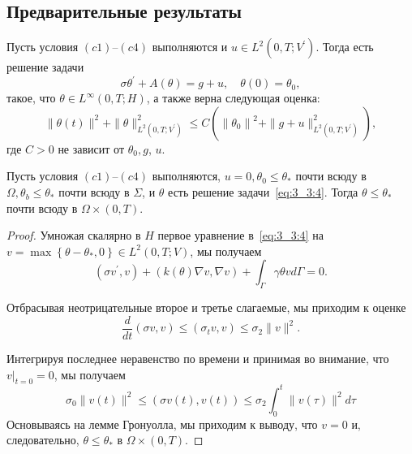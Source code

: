 \subsection{Предварительные результаты}
\label{subsec:ch3:sec3:subsec3}

\begin{lemma}
    \label{lm:3_3:1}
    Пусть условия $(c1)$--$(c4)$ выполняются и
    $u \in L^{2}\left(0, T ; V^{\prime}\right)$.
    Тогда есть решение задачи
    \begin{equation}
        \label{eq:3_3:4}
        \sigma \theta^{\prime}+A(\theta)=g+u, \quad \theta(0)=\theta_{0},
    \end{equation}
    такое, что $\theta \in L^{\infty}(0, T ; H)$, а также верна следующая оценка:
    \[
        \|\theta(t)\|^{2}+\|\theta\|_{L^{2}\left(0, T ; V^{\prime}\right)}^{2}
        \leq C\left(\left\|\theta_{0}\right\|^{2}+\|g+u\|_{L^{2}
        \left(0, T; V^{\prime}\right)}^{2}\right),
    \]
    где $C>0$ не зависит от $\theta_{0}, g$, $u$.
\end{lemma}

\begin{lemma}
    \label{lm:3_3:2}
    Пусть условия $(c1)$--$(c4)$ выполняются, $u=0, \theta_{0} \leq \theta_{*}$ почти всюду
    в $\Omega, \theta_{b} \leq \theta_{*}$ почти всюду в $\Sigma$, и $\theta$ есть
    решение задачи~\eqref{eq:3_3:4}.
    Тогда $\theta \leq \theta_{*}$ почти всюду в $\Omega \times(0, T)$.
\end{lemma}

\begin{proof}
    Умножая скалярно в $H$ первое уравнение в~\eqref{eq:3_3:4} на
    $v=\max \left\{\theta-\theta_{*}, 0\right\}\in L^{2}(0, T; V)$, мы получаем
    \[
        \left(\sigma v^{\prime}, v\right)+(k(\theta) \nabla v, \nabla v)
        + \int_{\Gamma} \gamma \theta v d \Gamma=0.
    \]

    Отбрасывая неотрицательные второе и третье слагаемые, мы приходим к оценке
    \[
        \frac{d}{d t}(\sigma v, v) \leq\left(\sigma_{t} v, v\right) \leq \sigma_{2}\|v\|^{2}.
    \]

    Интегрируя последнее неравенство по времени и принимая во внимание,
    что $\left.v\right|_{t=0}=0$, мы получаем
    \[
        \sigma_{0}\|v(t)\|^{2} \leq(\sigma v(t), v(t))
        \leq \sigma_{2} \int_{0}^{t}\|v(\tau)\|^{2} d \tau
    \]
    Основываясь на лемме Гронуолла, мы приходим к выводу, что $v=0$ и, следовательно,
    $\theta \leq \theta_{*}$ в $\Omega \times(0, T)$.
\end{proof}

